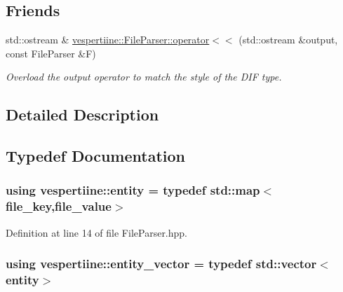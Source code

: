 \subsection*{Friends}
\begin{DoxyCompactItemize}
\item 
std\+::ostream \& \hyperlink{group__vespertiine_ga6d174b85be314a05d54a9d63a7f1fbbb}{vespertiine\+::\+File\+Parser\+::operator$<$$<$} (std\+::ostream \&output, const File\+Parser \&F)
\begin{DoxyCompactList}\small\item\em Overload the output operator to match the style of the D\+IF type. \end{DoxyCompactList}\end{DoxyCompactItemize}


\subsection{Detailed Description}


\subsection{Typedef Documentation}
\subsubsection[{\texorpdfstring{entity}{entity}}]{\setlength{\rightskip}{0pt plus 5cm}using {\bf vespertiine\+::entity} = typedef std\+::map$<$file\+\_\+key,file\+\_\+value$>$}\hypertarget{group__vespertiine_gaf9205d715bdeade18d7039864ef59b44}{}\label{group__vespertiine_gaf9205d715bdeade18d7039864ef59b44}


Definition at line 14 of file File\+Parser.\+hpp.

\subsubsection[{\texorpdfstring{entity\+\_\+vector}{entity_vector}}]{\setlength{\rightskip}{0pt plus 5cm}using {\bf vespertiine\+::entity\+\_\+vector} = typedef std\+::vector$<$entity$>$}\hypertarget{group__vespertiine_ga01f4e06d9363d6dc31a69d8a0553b93d}{}\label{group__vespertiine_ga01f4e06d9363d6dc31a69d8a0553b93d}


